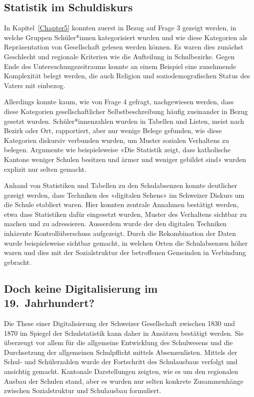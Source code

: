 
\subsection{Statistik im Schuldiskurs}

In Kapitel~\ref{Chapter5} konnten zuerst in Bezug auf Frage 3 gezeigt werden, in welche Gruppen Schüler*innen kategorisiert wurden und wie diese Kategorien als Repräsentation von Gesellschaft gelesen werden können. Es waren dies zunächst Geschlecht und regionale Kriterien wie die Aufteilung in Schulbezirke. Gegen Ende des Untersuchungszeitraums konnte an einem Beispiel eine zunehmende Komplexität belegt werden, die auch Religion und soziodemografischen Status des Vaters mit einbezog. 

Allerdings konnte kaum, wie von Frage 4 gefragt, nachgewiesen werden, dass diese Kategorien gesellschaftlicher Selbstbeschreibung häufig zueinander in Bezug gesetzt wurden. Schüler*innen\-zahl\-en wurden in Tabellen und Listen, meist nach Bezirk oder Ort, rapportiert, aber nur wenige Belege gefunden, wie diese Kategorien diskursiv verbunden wurden, um Muster sozialen Verhaltens zu belegen. Argumente wie beispielsweise «Die Statistik zeigt, dass katholische Kantone weniger Schulen besitzen und ärmer und weniger gebildet sind» wurden explizit nur selten gemacht.

Anhand von Statistiken und Tabellen zu den Schulabsenzen konnte deutlicher gezeigt werden, dass Techniken des «digitalen Sehens» im Schweizer Diskurs um die Schule etabliert waren. Hier konnten zentrale Annahmen bestätigt werden, etwa dass Statistiken dafür eingesetzt wurden, Muster des Verhaltens sichtbar zu machen und zu adressieren. Ausserdem wurde der den digitalen Techniken inhärente Kontrollüberschuss aufgezeigt. Durch die Rekombination der Daten wurde beispielsweise sichtbar gemacht, in welchen Orten die Schulabsenzen höher waren und dies mit der Sozialstruktur der betroffenen Gemeinden in Verbindung gebracht.

\subsection{Doch keine Digitalisierung im 19.~Jahrhundert?}

Die These einer Digitalisierung der Schweizer Gesellschaft zwischen 1830 und 1870 im Spiegel der Schulstatistik kann daher in Ansätzen bestätigt werden. Sie überzeugt vor allem für die allgemeine Entwicklung des Schulwesens und die Durchsetzung der allgemeinen Schulpflicht mittels Absenzenlisten. Mittels der Schul- und Schülerzahlen wurde der Fortschritt des Schulausbaus verfolgt und ansichtig gemacht. Kantonale Darstellungen zeigten, wie es um den regionalen Ausbau der Schulen stand, aber es wurden nur selten konkrete Zusammenhänge zwischen Sozialstruktur und Schulausbau formuliert.

